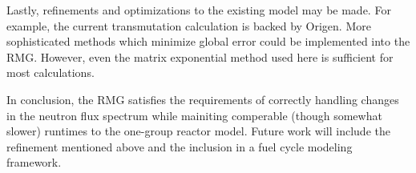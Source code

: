 Lastly, refinements and optimizations to the existing model may be made.  For example, the current 
transmutation calculation is backed by Origen.  More sophisticated methods which minimize global error 
could be implemented into the RMG.  However, even the matrix exponential method used here is 
sufficient for most calculations.

In conclusion, the RMG satisfies the requirements of correctly handling changes in the neutron flux 
spectrum while mainiting comperable (though somewhat slower) runtimes to the one-group reactor model.
Future work will include the refinement mentioned above and the inclusion in a fuel cycle modeling 
framework.
